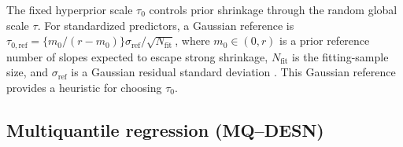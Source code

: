\documentclass[12pt,letterpaper]{article}
\numberwithin{equation}{section}
\begin{document}
The fixed hyperprior scale \(\tau_0\) controls prior shrinkage through the
random global scale \(\tau\). For standardized predictors, a Gaussian
reference is \(\tau_{0,\mathrm{ref}}=
\{m_0/(r-m_0)\}\sigma_{\mathrm{ref}}/\sqrt{N_{\mathrm{fit}}}\), where
\(m_0\in(0,r)\) is a prior reference number of slopes expected to escape
strong shrinkage, \(N_{\mathrm{fit}}\) is the fitting-sample size, and
\(\sigma_{\mathrm{ref}}\) is a Gaussian residual standard deviation
\citep{PiironenVehtari2017RHS}. This Gaussian reference provides a heuristic
for choosing \(\tau_0\).

\subsection{Multiquantile regression (MQ--DESN)}
\label{subsec:joint-qdesn}
\end{document}
